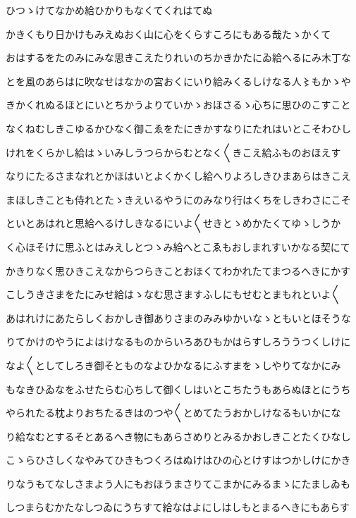 \documentclass[a4paper,11pt,landscape]{ltjtarticle}
\begin{document}
ひつゝけてなかめ給ひかりもなくてくれはてぬ
\par\medskip
かきくもり日かけもみえぬおく山に心をくらすころにもある哉たゝかくて
\par\medskip
おはするをたのみにみな思きこえたりれいのちかきかたにゐ給へるにみ木丁な
\par\medskip
とを風のあらはに吹なせはなかの宮おくにいり給みくるしけなる人〻もかゝや
\par\medskip
きかくれぬるほとにいとちかうよりていかゝおほさるゝ心ちに思ひのこすこと
\par\medskip
なくねむしきこゆるかひなく御こゑをたにきかすなりにたれはいとこそわひし
\par\medskip
けれをくらかし給はゝいみしうつらからむとなく〱きこえ給ふものおほえす
\par\medskip
なりにたるさまなれとかほはいとよくかくし給へりよろしきひまあらはきこえ
\par\medskip
まほしきことも侍れとたゝきえいるやうにのみなり行はくちをしきわさにこそ
\par\medskip
といとあはれと思給へるけしきなるにいよ〱せきとゝめかたくてゆゝしうか
\par\medskip
く心ほそけに思ふとはみえしとつゝみ給へとこゑもおしまれすいかなる契にて
\par\medskip
かきりなく思ひきこえなからつらきことおほくてわかれたてまつるへきにかす
\par\medskip
こしうきさまをたにみせ給はゝなむ思さますふしにもせむとまもれといよ〱
\par\medskip
あはれけにあたらしくおかしき御ありさまのみみゆかいなゝともいとほそうな
\par\medskip
りてかけのやうによはけなるものからいろあひもかはらすしろううつくしけに
\par\medskip
なよ〱としてしろき御そとものなよひかなるにふすまをゝしやりてなかにみ
\par\medskip
もなきひゐなをふせたらむ心ちして御くしはいとこちたうもあらぬほとにうち
\par\medskip
やられたる枕よりおちたるきはのつや〱とめてたうおかしけなるもいかにな
\par\medskip
り給なむとするそとあるへき物にもあらさめりとみるかおしきことたくひなし
\par\medskip
こゝらひさしくなやみてひきもつくろはぬけはひの心とけすはつかしけにかき
\par\medskip
りなうもてなしさまよう人にもおほうまさりてこまかにみるまゝにたましゐも
\par\medskip
しつまらむかたなしつゐにうちすて給なはよにしはしもとまるへきにもあらす
\end{document}
